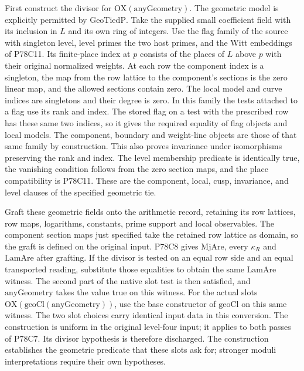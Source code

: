 First construct the divisor for $\mathrm{OX}(\mathrm{anyGeometry})$.
The geometric model is explicitly permitted by $\mathrm{GeoTiedP}$. Take the supplied small coefficient field with
its inclusion in $L$ and its own ring of integers. Use the flag family
of the source with singleton level, level primes the two host primes,
and the Witt embeddings of P78C11. Its finite-place index at $p$
consists of the places of $L$ above $p$ with their original normalized
weights. At each row the component index is a singleton, the map from
the row lattice to the component's sections is the zero linear map,
and the allowed sections contain zero. The local model and curve
indices are singletons and their degree is zero. In this family the
tests attached to a flag use its rank and index. The stored flag on
a test with the prescribed row has these same two indices, so it gives
the required equality of flag objects and local models. The
component, boundary and weight-line objects are those of that same
family by construction. This also proves invariance under
isomorphisms preserving the rank and index. The level membership
predicate is identically true, the vanishing condition follows from
the zero section maps, and the place compatibility is P78C11. These
are the component, local, cusp, invariance, and level clauses of the
specified geometric tie.

Graft these geometric fields onto the arithmetic record, retaining
its row lattices, row maps, logarithms, constants, prime support and
local observables. The component section maps just specified take
the retained row lattice as domain, so the graft is defined on the
original input. P78C8 gives $\mathrm{MjAre}$, every $\kappa_R$ and
$\mathrm{LamAre}$ after grafting. If the divisor is tested on an
equal row side and an equal transported reading, substitute those
equalities to obtain the same $\mathrm{LamAre}$ witness. The second
part of the native slot test is then satisfied, and
$\mathrm{anyGeometry}$ takes the value true on this witness. For the
actual slots $\mathrm{OX}(\mathrm{geoCl}(\mathrm{anyGeometry}))$,
use the base constructor of $\mathrm{geoCl}$ on this same witness.
The two slot choices carry identical input data in this conversion. The
construction is uniform in the original level-four input; it applies
to both passes of P78C7. Its divisor hypothesis is therefore discharged.
The construction establishes the geometric predicate that these slots
ask for; stronger moduli interpretations require their own hypotheses.
